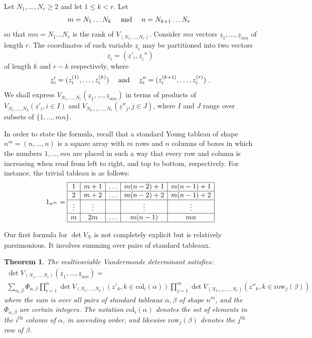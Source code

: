 \documentclass[10pt]{amsart}
\newtheorem{thm}{Theorem}[section]
\theoremstyle{definition}
\theoremstyle{remark}
\numberwithin{equation}{section}
\newcommand{\z}{\underline{z}}
\newcommand{\0}{\color{blue}{\mathsf{0}}}
\begin{document}
 Let $N_1,\ldots, N_r\geq 2$ and let  $1\leq k< r$. 
Let 
\[ m= N_1\ldots N_k  \quad  \hbox{ and  }\quad  n= N_{k+1} \ldots N_r\ \]
so that $mn = N_1\ldots N_r$ is the rank of $V_{(N_1,\ldots, N_r)}$.
Consider $mn$ vectors  $\z_1,\ldots, \z_{mn}$ of  length $r$. 
 The coordinates of each variable $\z_i$  may be partitioned into two vectors
 \[  \z_i = (\z'_i, \z_i'') 
 \]
of length $k$ and $r-k$ respectively, where 
\[ \z'_i = (z_i^{(1)}, \ldots, z_i^{(k)}) \quad \hbox{ and } \quad \z''_i = (z_i^{(k+1)}, \ldots, z_i^{(r)})\ .
\]
We shall express $V_{N_1,\ldots, N_r}(\z_1,\ldots, \z_{mn})$ in terms of products of  $V_{N_1,\ldots,N_k}(\z'_i, i\in I)$ and 
  $V_{N_{k+1},\ldots,N_r}(\z''_j, j\in J)$, where $I$ and $J$ range over subsets of $\{1,\ldots, mn\}$.
  
  
In order to state the formula, recall that a standard Young tableau of shape $n^m=(n,\ldots,n)$ is a square array with $m$ rows and $n$ columns  of boxes in which the numbers $1,\ldots, mn$ are placed in such a way that every row and column is increasing when read from left to right, and top to bottom, respectively. For instance, the trivial tableau is as follows:
\vspace{0.05in}
\[ 
1_{n^m} = \begin{array}{|c|c|c|c|c|} \hline
 1 &  m+1 & \ldots & m(n-2)+1 &  m(n-1)+1    \\  \hline
 2 & m+2  & \ldots &   m (n-2)+2 &   m(n-1)+2 \\ \hline
\vdots   &   \vdots  &    &  \vdots& \vdots    \\ \hline
m  &  2m & \ldots        & m(n-1) & mn  \\ \hline
\end{array}
\] 
\vspace{0.05in}

Our first  formula for $\det V_{\underline{N}}$ is not completely explicit but is  relatively parsimonious. It involves summing over pairs of  standard tableaux. 
\begin{thm} \label{thm: FirstVDMformula} The multivariable Vandermonde determinant satisfies:
\begin{multline}  \det V_{(N_1,\ldots, N_r)} (\z_1,\ldots , \z_{mn}) =   \label{Intro:FirstVDMformula} \\
 \sum_{\alpha,\beta}  \Phi_{\alpha,\beta} \prod_{i=1}^n  \det V_{(N_1,\ldots, N_k)} (z'_k, k\in \mathrm{col}_i(\alpha))  \prod_{j=1}^m  \det V_{(N_{k+1},\ldots, N_r)} (z''_k, k\in \mathrm{row}_j(\beta))   \end{multline}
 where the sum is over all pairs of standard tableaux $\alpha,\beta$ of shape $n^m$, and the $\Phi_{\alpha,\beta}$ are certain integers. The notation $\mathrm{col}_i(\alpha)$ denotes the set of elements in the $i^{\mathrm{th}}$ column of $\alpha$, in ascending order, and likewise $\mathrm{row}_j(\beta)$ denotes the $j^{\mathrm{th}}$ row of $\beta$.
 \end{thm} 
\end{document}
